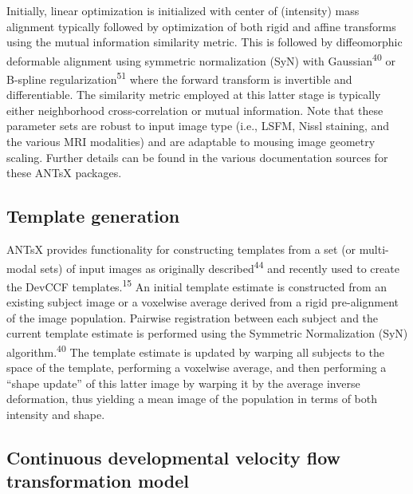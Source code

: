\documentclass[
  12pt,
]{article}
\begin{document}
Initially, linear optimization is initialized with center of (intensity)
mass alignment typically followed by optimization of both rigid and
affine transforms using the mutual information similarity metric. This
is followed by diffeomorphic deformable alignment using symmetric
normalization (SyN) with Gaussian\textsuperscript{40} or B-spline
regularization\textsuperscript{51} where the forward transform is
invertible and differentiable. The similarity metric employed at this
latter stage is typically either neighborhood cross-correlation or
mutual information. Note that these parameter sets are robust to input
image type (i.e., LSFM, Nissl staining, and the various MRI modalities)
and are adaptable to mousing image geometry scaling. Further details can
be found in the various documentation sources for these ANTsX packages.

\hypertarget{template-generation}{%
\subsection*{Template generation}\label{template-generation}}

ANTsX provides functionality for constructing templates from a set (or
multi-modal sets) of input images as originally
described\textsuperscript{44} and recently used to create the DevCCF
templates.\textsuperscript{15} An initial template estimate is
constructed from an existing subject image or a voxelwise average
derived from a rigid pre-alignment of the image population. Pairwise
registration between each subject and the current template estimate is
performed using the Symmetric Normalization (SyN)
algorithm.\textsuperscript{40} The template estimate is updated by
warping all subjects to the space of the template, performing a
voxelwise average, and then performing a ``shape update'' of this latter
image by warping it by the average inverse deformation, thus yielding a
mean image of the population in terms of both intensity and shape.

\hypertarget{continuous-developmental-velocity-flow-transformation-model}{%
\subsection*{Continuous developmental velocity flow transformation
model}\label{continuous-developmental-velocity-flow-transformation-model}}
\end{document}
